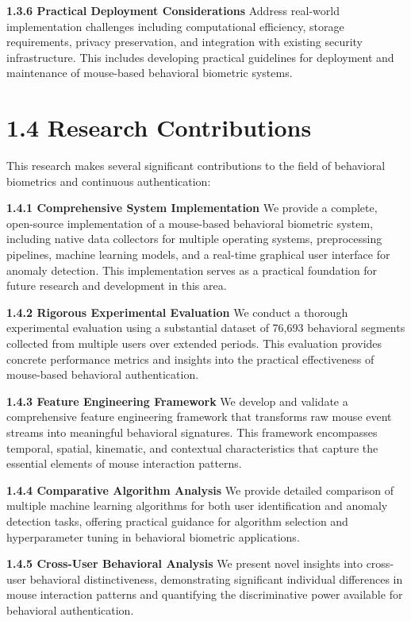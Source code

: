 \documentclass[
  12pt,
  a4paper,
]{report}
\begin{document}
\textbf{1.3.6 Practical Deployment Considerations} Address real-world
implementation challenges including computational efficiency, storage
requirements, privacy preservation, and integration with existing
security infrastructure. This includes developing practical guidelines
for deployment and maintenance of mouse-based behavioral biometric
systems.

\section{1.4 Research Contributions}\label{research-contributions}

This research makes several significant contributions to the field of
behavioral biometrics and continuous authentication:

\textbf{1.4.1 Comprehensive System Implementation} We provide a
complete, open-source implementation of a mouse-based behavioral
biometric system, including native data collectors for multiple
operating systems, preprocessing pipelines, machine learning models, and
a real-time graphical user interface for anomaly detection. This
implementation serves as a practical foundation for future research and
development in this area.

\textbf{1.4.2 Rigorous Experimental Evaluation} We conduct a thorough
experimental evaluation using a substantial dataset of 76,693 behavioral
segments collected from multiple users over extended periods. This
evaluation provides concrete performance metrics and insights into the
practical effectiveness of mouse-based behavioral authentication.

\textbf{1.4.3 Feature Engineering Framework} We develop and validate a
comprehensive feature engineering framework that transforms raw mouse
event streams into meaningful behavioral signatures. This framework
encompasses temporal, spatial, kinematic, and contextual characteristics
that capture the essential elements of mouse interaction patterns.

\textbf{1.4.4 Comparative Algorithm Analysis} We provide detailed
comparison of multiple machine learning algorithms for both user
identification and anomaly detection tasks, offering practical guidance
for algorithm selection and hyperparameter tuning in behavioral
biometric applications.

\textbf{1.4.5 Cross-User Behavioral Analysis} We present novel insights
into cross-user behavioral distinctiveness, demonstrating significant
individual differences in mouse interaction patterns and quantifying the
discriminative power available for behavioral authentication.
\end{document}
